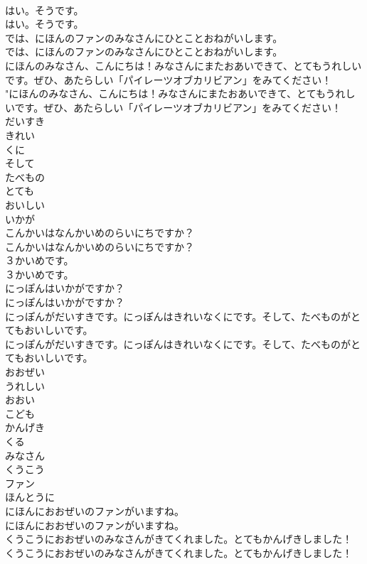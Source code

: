 \documentclass[8pt]{extreport}
\begin{document}
\begin{CJK}{UTF8}{min}
\\	はい。そうです。	
\\	はい。そうです。 
\\	では、にほんのファンのみなさんにひとことおねがいします。	
\\	では、にほんのファンのみなさんにひとことおねがいします。 
\\	にほんのみなさん、こんにちは！みなさんにまたおあいできて、とてもうれしいです。ぜひ、あたらしい「パイレーツオブカリビアン」をみてください！	
\\	"にほんのみなさん、こんにちは！みなさんにまたおあいできて、とてもうれしいです。ぜひ、あたらしい「パイレーツオブカリビアン」をみてください！ 
\\	だいすき
\\	きれい
\\	くに
\\	そして
\\	たべもの
\\	とても
\\	おいしい
\\	いかが
\\	こんかいはなんかいめのらいにちですか？	
\\	こんかいはなんかいめのらいにちですか？ 
\\	３かいめです。	
\\	３かいめです。 
\\	にっぽんはいかがですか？	
\\	にっぽんはいかがですか？ 
\\	にっぽんがだいすきです。にっぽんはきれいなくにです。そして、たべものがとてもおいしいです。	
\\	にっぽんがだいすきです。にっぽんはきれいなくにです。そして、たべものがとてもおいしいです。 
\\	おおぜい
\\	うれしい
\\	おおい
\\	こども
\\	かんげき
\\	くる
\\	みなさん
\\	くうこう
\\	ファン
\\	ほんとうに
\\	にほんにおおぜいのファンがいますね。	
\\	にほんにおおぜいのファンがいますね。 
\\	くうこうにおおぜいのみなさんがきてくれました。とてもかんげきしました！	
\\	くうこうにおおぜいのみなさんがきてくれました。とてもかんげきしました！ 

\end{CJK}
\end{document}

